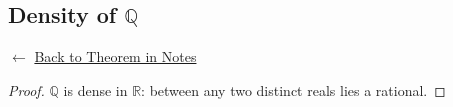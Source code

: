 
\subsection*{Density of $\mathbb{Q}$}
\label{prf:density-of-rationals}

\begin{remark*}[Return]
$\leftarrow$ \hyperref[thm:density-of-rationals]{Back to Theorem in Notes}
\end{remark*}

\begin{proof}
\Claim $\mathbb{Q}$ is dense in $\mathbb{R}$: between any two distinct reals lies a rational.

\end{proof}

\begin{remark*}
\end{remark*}

\begin{remark*}[Dependencies]
\end{remark*}
